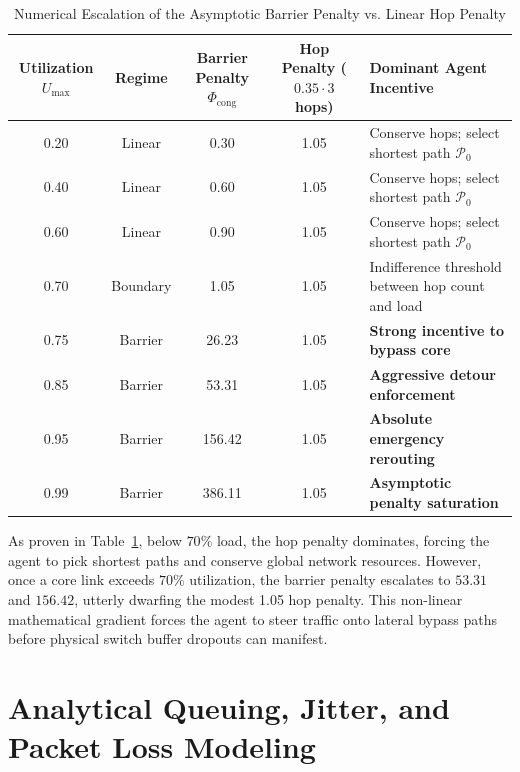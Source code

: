 \documentclass[12pt,a4paper,oneside]{report}
\begin{document}
\begin{table}[htbp]
\centering
\caption{Numerical Escalation of the Asymptotic Barrier Penalty vs. Linear Hop Penalty}
\label{tab:barrier_numerical_values}
\begin{tabular}{c c c c l}
\toprule
\textbf{Utilization $U_{\max}$} & \textbf{Regime} & \textbf{Barrier Penalty $\Phi_{\text{cong}}$} & \textbf{Hop Penalty ($0.35 \cdot 3$ hops)} & \textbf{Dominant Agent Incentive} \\
\midrule
0.20 & Linear & 0.30 & 1.05 & Conserve hops; select shortest path $\mathcal{P}_0$ \\
0.40 & Linear & 0.60 & 1.05 & Conserve hops; select shortest path $\mathcal{P}_0$ \\
0.60 & Linear & 0.90 & 1.05 & Conserve hops; select shortest path $\mathcal{P}_0$ \\
0.70 & Boundary & 1.05 & 1.05 & Indifference threshold between hop count and load \\
0.75 & Barrier & 26.23 & 1.05 & \textbf{Strong incentive to bypass core} \\
0.85 & Barrier & 53.31 & 1.05 & \textbf{Aggressive detour enforcement} \\
0.95 & Barrier & 156.42 & 1.05 & \textbf{Absolute emergency rerouting} \\
0.99 & Barrier & 386.11 & 1.05 & \textbf{Asymptotic penalty saturation} \\
\bottomrule
\end{tabular}
\end{table}

As proven in Table~\ref{tab:barrier_numerical_values}, below $70\%$ load, the hop penalty dominates, forcing the agent to pick shortest paths and conserve global network resources. However, once a core link exceeds $70\%$ utilization, the barrier penalty escalates to $53.31$ and $156.42$, utterly dwarfing the modest 1.05 hop penalty. This non-linear mathematical gradient forces the agent to steer traffic onto lateral bypass paths before physical switch buffer dropouts can manifest.

\section{Analytical Queuing, Jitter, and Packet Loss Modeling}
\end{document}
